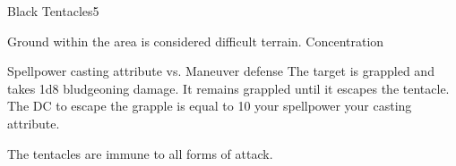 \begin{spellsection}{Black Tentacles}{5}
    \begin{spellheader}
    \end{spellheader}
    \begin{spellcontent}
        \begin{spelltargetinginfo}
        \end{spelltargetinginfo}
        \begin{spelleffects}
            \spelleffect Ground within the area is considered difficult terrain.
            \spelldur Concentration
        \end{spelleffects}
    \end{spellcontent}
    \begin{spellsubcontent}
        \begin{spelltargetinginfo}
        \end{spelltargetinginfo}
        \begin{spelleffects}
            \begin{spellattack}{Spellpower \add casting attribute vs. Maneuver defense}
                \spellsuccess The target is grappled and takes 1d8 bludgeoning damage. It remains grappled until it escapes the tentacle. The DC to escape the grapple is equal to 10 \add your spellpower \add your casting attribute.
            \end{spellattack}
        \end{spelleffects}
    \end{spellsubcontent}
    \begin{spellfooter}
        \spellnotes The tentacles are immune to all forms of attack.
        \miscastyou
    \end{spellfooter}
\end{spellsection}

